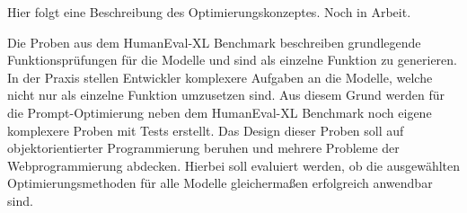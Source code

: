 \begin{tcolorbox}[
	enhanced,
	colback=yellow!5!white,
	colframe=yellow!75!black!70,
	title= Mein roter Faden
	]
	Hier folgt eine Beschreibung des Optimierungskonzeptes. Noch in Arbeit.
\end{tcolorbox}

Die Proben aus dem HumanEval-XL Benchmark beschreiben grundlegende Funktionsprüfungen für die Modelle und sind als einzelne Funktion zu generieren. In der Praxis stellen Entwickler komplexere Aufgaben an die Modelle, welche nicht nur als einzelne Funktion umzusetzen sind. Aus diesem Grund werden für die Prompt-Optimierung neben dem HumanEval-XL Benchmark noch eigene komplexere Proben mit Tests erstellt. Das Design dieser Proben soll auf objektorientierter Programmierung beruhen und mehrere Probleme der Webprogrammierung abdecken. Hierbei soll evaluiert werden, ob die ausgewählten Optimierungsmethoden für alle Modelle gleichermaßen erfolgreich anwendbar sind.




